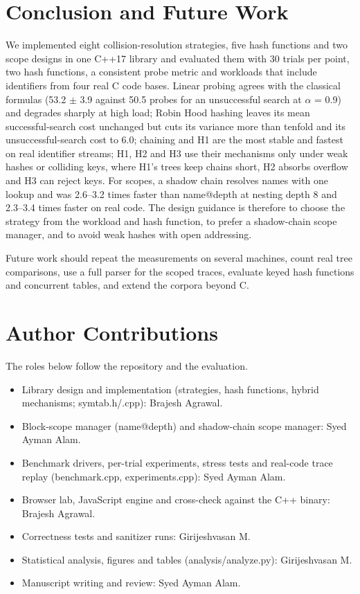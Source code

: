 \documentclass{ieeeaccess}
\begin{document}
\section{Conclusion and Future Work}

We implemented eight collision-resolution strategies, five hash functions and two scope designs in one C++17 library and evaluated them with 30 trials per point, two hash functions, a consistent probe metric and workloads that include identifiers from four real C code bases. Linear probing agrees with the classical formulas (53.2 $\pm$ 3.9 against 50.5 probes for an unsuccessful search at $\alpha$ = 0.9) and degrades sharply at high load; Robin Hood hashing leaves its mean successful-search cost unchanged but cuts its variance more than tenfold and its unsuccessful-search cost to 6.0; chaining and H1 are the most stable and fastest on real identifier streams; H1, H2 and H3 use their mechanisms only under weak hashes or colliding keys, where H1's trees keep chains short, H2 absorbs overflow and H3 can reject keys. For scopes, a shadow chain resolves names with one lookup and was 2.6--3.2 times faster than name@depth at nesting depth 8 and 2.3--3.4 times faster on real code. The design guidance is therefore to choose the strategy from the workload and hash function, to prefer a shadow-chain scope manager, and to avoid weak hashes with open addressing.

Future work should repeat the measurements on several machines, count real tree comparisons, use a full parser for the scoped traces, evaluate keyed hash functions and concurrent tables, and extend the corpora beyond C.

\section*{Author Contributions}

The roles below follow the repository and the evaluation.

\begin{itemize}
\item Library design and implementation (strategies, hash functions, hybrid mechanisms; symtab.h/.cpp): Brajesh Agrawal.
\item Block-scope manager (name@depth) and shadow-chain scope manager: Syed Ayman Alam.
\item Benchmark drivers, per-trial experiments, stress tests and real-code trace replay (benchmark.cpp, experiments.cpp): Syed Ayman Alam.
\item Browser lab, JavaScript engine and cross-check against the C++ binary: Brajesh Agrawal.
\item Correctness tests and sanitizer runs: Girijeshvasan M.
\item Statistical analysis, figures and tables (analysis/analyze.py): Girijeshvasan M.
\item Manuscript writing and review: Syed Ayman Alam.
\end{itemize}
\end{document}
